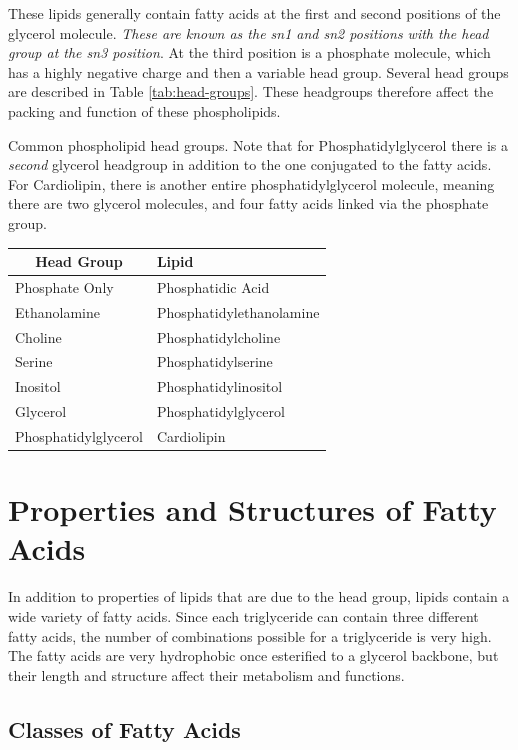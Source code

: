 \documentclass{tufte-handout}
\begin{document}
  These lipids generally contain fatty acids at the first and second positions of the glycerol molecule.  \emph{These are known as the sn1 and sn2 positions with the head group at the sn3 position}.  At the third position is a phosphate molecule, which has a highly negative charge and then a variable head group.  Several head groups are described in Table \ref{tab:head-groups}.  These headgroups therefore affect the packing and function of these phospholipids.  

\begin{margintable}
\centering
\caption{Common phospholipid head groups.  Note that for Phosphatidylglycerol there is a \emph{second} glycerol headgroup in addition to the one conjugated to the fatty acids.  For Cardiolipin, there is another entire phosphatidylglycerol molecule, meaning there are two glycerol molecules, and four fatty acids linked via the phosphate group.}
\label{tab:head-groups}
\begin{tabular}{ll}
\hline
\multicolumn{1}{c}{\textbf{Head Group}} & \textbf{Lipid} \\ \hline
Phosphate Only          & Phosphatidic Acid      \\
Ethanolamine           & Phosphatidylethanolamine           \\
Choline           & Phosphatidylcholine          \\
Serine        & Phosphatidylserine \\
Inositol & Phosphatidylinositol \\
Glycerol & Phosphatidylglycerol \\
Phosphatidylglycerol & Cardiolipin     
\end{tabular}
\end{margintable}

\section{Properties and Structures of Fatty Acids}

In addition to properties of lipids that are due to the head group, lipids contain a wide variety of fatty acids.  Since each triglyceride can contain three different fatty acids, the number of combinations possible for a triglyceride is very high.  The fatty acids are very hydrophobic once esterified to a glycerol backbone, but their length and structure affect their metabolism and functions.

\subsection{Classes of Fatty Acids}
\end{document}
